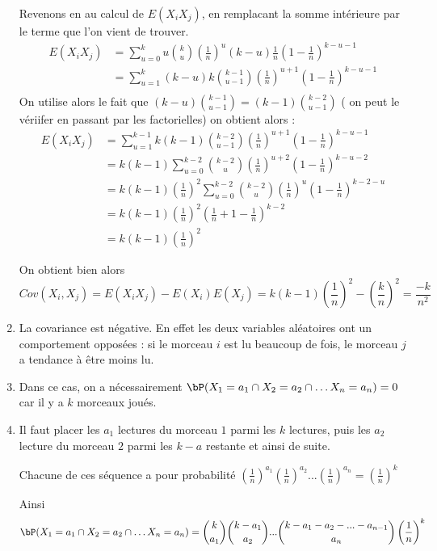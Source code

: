 \begin{correction}
\begin{enumerate}
Revenons en au calcul de $E(X_iX_j)$, en remplacant la  somme intérieure par le terme que l'on vient de trouver. 
\begin{align*}
E(X_iX_j) &= \sum_{u=0}^k u \binom{k}{u} \left(\frac{1}{n}\right)^{u}    (k-u) \frac{1}{n}  \left(1-\frac{1}{n}\right)^{k-u-1}\\
&=  \sum_{u=1}^k  (k-u)  k\binom{k-1}{u-1} \left(\frac{1}{n}\right)^{u+1}    \left(1-\frac{1}{n}\right)^{k-u-1}\\
\end{align*}
On utilise alors le fait que $(k-u) \binom{k-1}{u-1} =(k-1) \binom{k-2}{u-1}$ ( on peut le vériifer en passant par les factorielles) on obtient alors :
\begin{align*}
E(X_iX_j) &= \sum_{u=1}^{k-1}  k (k-1) \binom{k-2}{u-1} \left(\frac{1}{n}\right)^{u+1}    \left(1-\frac{1}{n}\right)^{k-u-1}\\
&= k (k-1)  \sum_{u=0}^{k-2}  \binom{k-2}{u} \left(\frac{1}{n}\right)^{u+2}    \left(1-\frac{1}{n}\right)^{k-u-2}\\
&= k (k-1) (\frac{1}{n} )^2 \sum_{u=0}^{k-2}  \binom{k-2}{u} \left(\frac{1}{n}\right)^{u}    \left(1-\frac{1}{n}\right)^{k-2- u}\\
&= k (k-1) (\frac{1}{n} )^2 \left( \frac{1}{n} +1 -\frac{1}{n}\right)^{k-2}\\
&=k(k-1) (\frac{1}{n} )^2
\end{align*}


On obtient bien alors 
$$Cov(X_i,X_j)  =E(X_iX_j) -E(X_i)E(X_j) = k(k-1) (\frac{1}{n} )^2 - (\frac{k}{n})^2= \frac{-k}{n^2}$$


\item La covariance est négative. En effet les deux variables aléatoires ont un comportement opposées : si le morceau $i$ est lu beaucoup de fois, le morceau $j$ a tendance à être moins lu. 


\item 
Dans ce cas, on a nécessairement
$\bP(X_1 =a_1 \cap X_2 =a_2 \cap \dots X_n =a_n)=0$ car il y a $k$ morceaux joués. 


\item Il faut placer les $a_1$ lectures du morceau $1$ parmi les $k$ lectures, puis les $a_2$ lecture du morceau $2$ parmi les $k-a$ restante et ainsi de suite. 

Chacune de ces séquence a pour probabilité $\left(\frac{1}{n} \right)^{a_1}\left(\frac{1}{n} \right)^{a_2}...\left(\frac{1}{n} \right)^{a_n}=\left(\frac{1}{n} \right)^{k}$

Ainsi $$\bP(X_1 =a_1 \cap X_2 =a_2 \cap \dots X_n =a_n) = 
\binom{k}{a_1}\binom{k-a_1}{a_2}...\binom{k-a_1-a_2 -...-a_{n-1}}{a_n}
\left(\frac{1}{n} \right)^{k} $$


\end{enumerate}
\end{correction}
